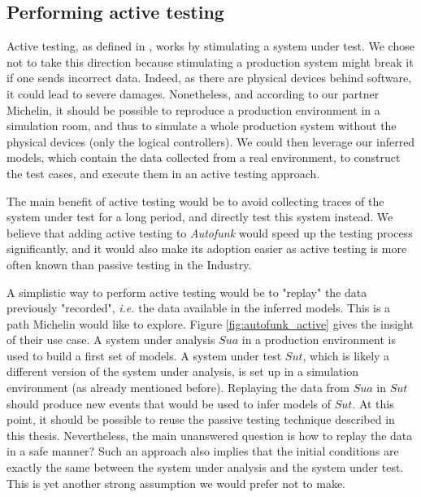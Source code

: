 
\subsection{Performing active testing}
\label{sec:conclusion:testing:active}

Active testing, as defined in
,
works by stimulating a system under test. We chose not to take
this direction because stimulating a production system might
break it if one sends incorrect data. Indeed, as there are
physical devices behind software, it could lead to severe
damages.  Nonetheless, and according to our partner Michelin, it
should be possible to reproduce a production environment in a
simulation room, and thus to simulate a whole production system
without the physical devices (only the logical controllers). We
could then leverage our inferred models, which contain the data
collected from a real environment, to construct the test cases,
and execute them in an active testing approach.

The main benefit of active testing would be to avoid collecting
traces of the system under test for a long period, and directly
test this system instead. We believe that adding active testing
to \textit{Autofunk} would speed up the testing process
significantly, and it would also make its adoption easier as
active testing is more often known than passive testing in the
Industry.

A simplistic way to perform active testing would be to "replay"
\cite{thane2000using,Orso:2005:SCR:1082983.1083251} the data
previously "recorded", \emph{i.e.} the data available in the
inferred models. This is a path Michelin would like to explore.
Figure \ref{fig:autofunk_active} gives the insight of their use
case. A system under analysis $\mathit{Sua}$ in a production
environment is used to build a first set of models. A system
under test $\mathit{Sut}$, which is likely a different version of
the system under analysis, is set up in a simulation environment
(as already mentioned before).  Replaying the data from
$\mathit{Sua}$ in $\mathit{Sut}$ should produce new events that
would be used to infer models of $\mathit{Sut}$.  At this point,
it should be possible to reuse the passive testing technique
described in this thesis.  Nevertheless, the main unanswered
question is how to replay the data in a safe manner?  Such an
approach also implies that the initial conditions are exactly the
same between the system under analysis and the system under test.
This is yet another strong assumption we would prefer not to
make.


